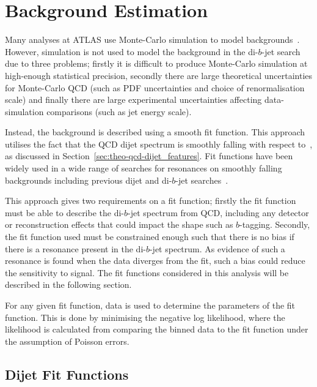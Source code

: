 

\section{Background Estimation}
\label{sec:bkg-fit}

Many analyses at ATLAS use Monte-Carlo simulation
to model backgrounds~\cite{obj-Hbb}.
However, simulation is not used to model the
background in the di-$b$-jet search due to three problems;
firstly it is difficult to produce Monte-Carlo simulation at high-enough statistical precision,
secondly there are large theoretical uncertainties for Monte-Carlo QCD
(such as PDF uncertainties and choice of renormalisation scale)
and finally there are large experimental uncertainties affecting
data-simulation comparisons (such as jet energy scale).

Instead, the background is described using a smooth fit function.
This approach utilises the fact that the QCD dijet spectrum
is smoothly falling with respect to~\mjj{},
as discussed in Section~\ref{sec:theo-qcd-dijet_features}.
Fit functions have been widely used
in a wide range of searches for resonances on smoothly falling backgrounds
including previous dijet and di-$b$-jet searches~\cite{dijet-mori16_paper,dibjet-mori16_paper,bkg-higgs_gammagamma}.

This approach gives two requirements on a fit function;
firstly the fit function must be able to describe the di-$b$-jet spectrum from QCD,
including any detector or reconstruction effects that could impact the shape such as $b$-tagging.
Secondly,  the fit function used must be constrained enough
such that there is no bias if there is a resonance present in the di-$b$-jet spectrum.
As evidence of such a resonance is found when the data diverges from the fit,
such a bias could reduce the sensitivity to signal.
The fit functions considered in this analysis will be described in the following section.

For any given fit function, 
data is used to determine the parameters of the fit function.
This is done by minimising the negative log likelihood,
where the likelihood is calculated from comparing
the binned data to the fit function
under the assumption of Poisson errors.

\subsection{Dijet Fit Functions}
\label{sec:bkg-bkg_func}

